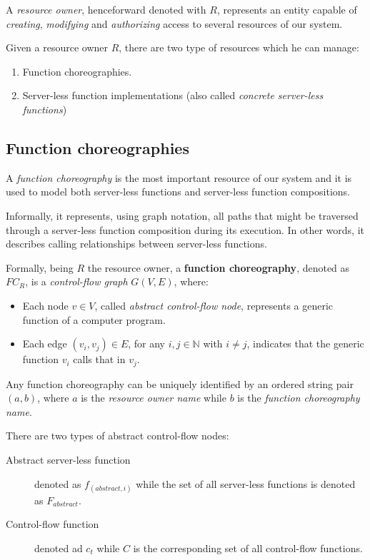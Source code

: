 \documentclass[10pt,a4paper]{article}
\begin{document}
A \textit{resource owner}, henceforward denoted with $R$, represents an entity capable of \textit{creating}, \textit{modifying} and \textit{authorizing} access to several resources of our system.

Given a resource owner $R$, there are two type of resources which he can manage:

\begin{enumerate}
\item Function choreographies.
\item Server-less function implementations (also called \textit{concrete server-less functions})
\end{enumerate}

\subsection{Function choreographies}

A \textit{function choreography} is the most important resource of our system and it is used to model both server-less functions and server-less function compositions.

Informally, it represents, using graph notation, all paths that might be traversed through a server-less function composition during its execution. In other words, it describes calling relationships between server-less functions.

Formally, being $R$ the resource owner, a \textbf{function choreography}, denoted as $FC_R$, is a \textit{control-flow graph} $G(V,E)$, where:

\begin{itemize}
\item Each node $v \in V$, called \textit{abstract control-flow node}, represents a generic function of a computer program.
\item Each edge $(v_i, v_j) \in E$, for any $i,j \in \mathbb{N}$ with $i \neq j$, indicates that the generic function $v_i$ calls that in $v_j$.
\end{itemize} 

Any function choreography can be  uniquely identified by an ordered string pair $(a, b)$, where $a$ is the \textit{resource owner name} while $b$ is the \textit{function choreography name}.

There are two types of abstract control-flow nodes:

\begin{description}
\item[Abstract server-less function] denoted as $f_{(abstract, i)}$ while the set of all server-less functions is denoted as $F_{abstract}$.
\item[Control-flow function] denoted ad $c_t$ while $C$ is the corresponding set of all control-flow functions.
\end{description}
\end{document}
